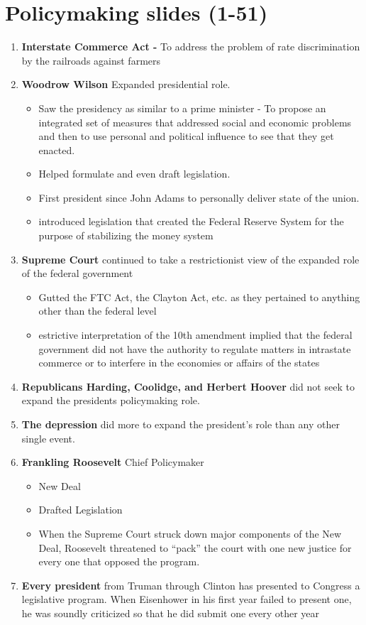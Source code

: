 \documentclass{article}
\begin{document}
\section*{Policymaking slides (1-51)}
\begin{enumerate}
    \item \textbf{Interstate Commerce Act - } To address the problem of rate discrimination by 
the railroads against farmers
    \item \textbf{Woodrow Wilson} Expanded presidential role. \begin{itemize} 
        \item Saw the presidency as similar to a prime minister - To  propose an integrated set of measures that addressed social and economic problems and then to use personal  and political influence to see that they get enacted. 
        \item Helped formulate and even draft legislation. 
        \item First president since John Adams to personally deliver state of the union. 
        \item introduced legislation that created the Federal Reserve 
System for the purpose of stabilizing the money system 
    \end{itemize} 
    \item \textbf{Supreme Court} continued to take a  restrictionist view of the expanded role of the federal government 
    \begin{itemize}
        \item Gutted  the FTC Act, the Clayton Act, etc. as they  pertained to anything other than the federal level
        \item estrictive interpretation of the 10th amendment implied that the federal government did not have the 
authority to regulate matters in intrastate commerce or to interfere in the economies or affairs  of the states
    \end{itemize}
        \item  \textbf{ Republicans Harding, Coolidge,  and Herbert Hoover} did not seek to expand the presidents policymaking role. 
        \item \textbf{The depression} did more to expand the president’s role than any other single event.  
        \item \textbf{Frankling Roosevelt} Chief Policymaker 
        \begin{itemize}
            \item New Deal 
            \item Drafted Legislation 
            \item When the Supreme Court struck down major components of the New Deal, Roosevelt threatened to  “pack” the court with one new justice for every one that opposed the program.  
        \end{itemize}
        \item  \textbf{Every president} from Truman through  Clinton has presented to Congress a legislative program.  When Eisenhower in his first year failed to present one, he was soundly criticized so that he  did submit one every other year
\end{enumerate}
\end{document}
